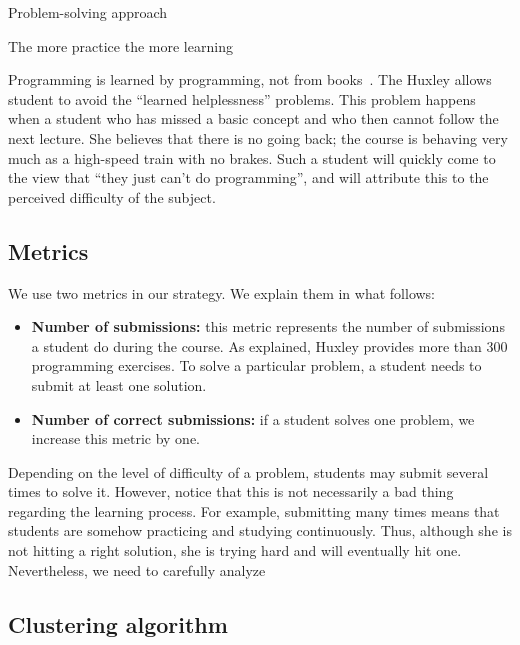 Problem-solving approach

The more practice the more learning

Programming is learned by programming, not from books~\cite{}.
The Huxley allows student to avoid the ``learned helplessness'' problems. This problem happens when a student who has missed a basic concept and who then cannot follow the next lecture. She believes that there is no going back; the course is behaving very much as a high-speed train with no brakes. Such a student will quickly come to the view that ``they just can't do programming'', and will attribute this to the perceived difficulty of the subject.

\subsection{Metrics}

\label{sec:metrics}

We use two metrics in our strategy. We explain them in what follows:

\begin{itemize}

	\item \textbf{Number of submissions:} this metric represents the number of submissions a student do during the course. As explained, Huxley provides more than 300 programming exercises. To solve a particular problem, a student needs to submit at least one solution.

	\item \textbf{Number of correct submissions:} if a student solves one problem, we increase this metric by one.

\end{itemize}

Depending on the level of difficulty of a problem, students may submit several times to solve it. However, notice that this is not necessarily a bad thing regarding the learning process. For example, submitting many times means that students are somehow practicing and studying continuously. Thus, although she is not hitting a right solution, she is trying hard and will eventually hit one. Nevertheless, we need to carefully analyze \todots


\subsection{Clustering algorithm}


